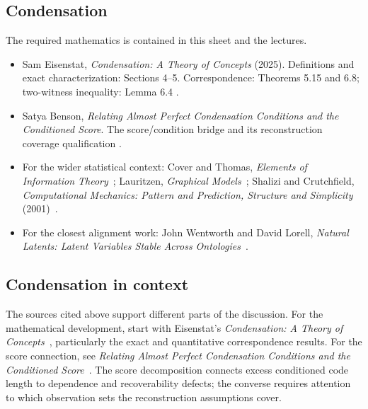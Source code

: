 \documentclass[11pt]{article}
\begin{document}
\subsection{Condensation}
\label{sec:reading}
The required mathematics is contained in this sheet and the lectures.
\begin{itemize}
\item Sam Eisenstat, \emph{Condensation: A Theory of Concepts} (2025).
Definitions and exact characterization: Sections 4--5. Correspondence:
Theorems 5.15 and 6.8; two-witness inequality: Lemma 6.4
\citep{eisenstat2025condensation}.
\item Satya Benson, \emph{Relating Almost Perfect Condensation Conditions and
the Conditioned Score}. The score/condition bridge and its reconstruction
coverage qualification
\citep{benson2026relating}.
\item For the wider statistical context: Cover and Thomas,
\emph{Elements of Information Theory}~\citep{cover2006elements}; Lauritzen, \emph{Graphical Models}~\citep{lauritzen1996graphical};
Shalizi and Crutchfield, \emph{Computational Mechanics: Pattern and Prediction,
Structure and Simplicity} (2001)~\citep{shalizi2001computational}.
\item For the closest alignment work: John Wentworth and David Lorell,
\emph{Natural Latents: Latent Variables Stable Across
Ontologies}~\citep{wentworth2025natural}.
\end{itemize}

\subsection{Condensation in context}
The sources cited above support different parts
of the discussion. For the mathematical development, start with
Eisenstat's \emph{Condensation: A Theory of Concepts}~\citep{eisenstat2025condensation},
particularly the exact and quantitative correspondence results.
For the score connection, see
\emph{Relating Almost Perfect Condensation Conditions and the Conditioned Score}~\citep{benson2026relating}.
The score decomposition connects excess conditioned code length to dependence
and recoverability defects; the converse requires attention to which observation
sets the reconstruction assumptions cover.



\end{document}
